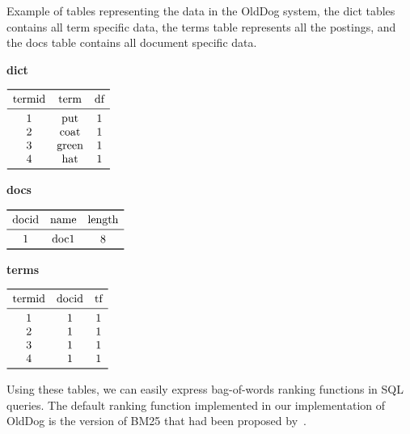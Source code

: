 \begin{table}
	\centering
	\caption{Example of tables representing the data in the OldDog system, the dict tables contains all term specific data, the terms table represents all the postings, and the docs table contains all document specific data.}
	\begin{subtable}[t]{0.31\linewidth}
		\centering
		\caption{\textbf{dict}}
		\(\begin{array}{ccc}
			\toprule
			\text{termid} & \text{term} & \text{df}  \\  
			\midrule
			1 & \text{put} 	 	& 1 \\ 
			2 & \text{coat}  	& 1 \\ 
			3 & \text{green}	& 1 \\ 
			4 & \text{hat} 	 	& 1 \\
			\bottomrule
		\end{array}\)
	\end{subtable}
	\begin{subtable}[t]{0.31\linewidth}
		\centering
		\caption{\textbf{docs}}
		\(\begin{array}{ccc}
			\toprule
			\text{docid} & \text{name} & \text{length}  \\  
			\midrule
			1 & \text{doc1} & 8 \\ 
			\bottomrule
		\end{array}\)
	\end{subtable}
	\begin{subtable}[t]{0.31\linewidth}
		\centering
		\caption{\textbf{terms}}
		\(\begin{array}{ccc}
			\toprule
			\text{termid} & \text{docid} & \text{tf}  \\  
			\midrule
			1 & 1 & 1 \\ 
			2 & 1 & 1 \\ 
			3 & 1 & 1 \\ 
			4 & 1 & 1 \\
			\bottomrule
		\end{array}\)
	\end{subtable}
	\label{olddog-tables}
\end{table}

Using these tables, we can easily express bag-of-words ranking functions in SQL queries. The default ranking function implemented in our implementation of OldDog is the version of BM25 that had been proposed by~\citet{bm25-robertson}.

